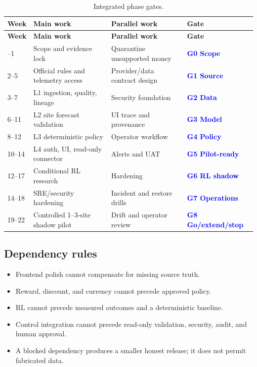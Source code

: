 \documentclass[11pt,a4paper]{article}
\newcommand{\gate}[1]{\textcolor{blue}{\textbf{#1}}}
\begin{document}
\begin{footnotesize}
\begin{longtable}{@{}p{1.5cm}p{5.0cm}p{5.2cm}p{2.7cm}@{}}
\caption{Integrated phase gates.}\label{tab:gates}\\
\toprule
\textbf{Week} & \textbf{Main work} & \textbf{Parallel work} & \textbf{Gate}\\
\midrule
\endfirsthead
\toprule
\textbf{Week} & \textbf{Main work} & \textbf{Parallel work} & \textbf{Gate}\\
\midrule
\endhead
\bottomrule
\endfoot
0--1 & Scope and evidence lock & Quarantine unsupported money & \gate{G0 Scope}\\
2--5 & Official rules and telemetry access & Provider/data contract design & \gate{G1 Source}\\
3--7 & L1 ingestion, quality, lineage & Security foundation & \gate{G2 Data}\\
6--11 & L2 site forecast validation & UI trace and provenance & \gate{G3 Model}\\
8--12 & L3 deterministic policy & Operator workflow & \gate{G4 Policy}\\
10--14 & L4 auth, UI, read-only connector & Alerts and UAT & \gate{G5 Pilot-ready}\\
12--17 & Conditional RL research & Hardening & \gate{G6 RL shadow}\\
14--18 & SRE/security hardening & Incident and restore drills & \gate{G7 Operations}\\
19--22 & Controlled 1--3-site shadow pilot & Drift and operator review & \gate{G8 Go/extend/stop}\\
\end{longtable}
\end{footnotesize}

\subsection{Dependency rules}

\begin{itemize}
  \item Frontend polish cannot compensate for missing source truth.
  \item Reward, discount, and currency cannot precede approved policy.
  \item RL cannot precede measured outcomes and a deterministic baseline.
  \item Control integration cannot precede read-only validation, security, audit, and human approval.
  \item A blocked dependency produces a smaller honest release; it does not permit fabricated data.
\end{itemize}
\end{document}
